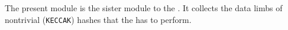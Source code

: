 The present module is the sister module to the \hashInfoMod{}.
It collects the data limbs of nontrivial (\texttt{KECCAK}) hashes that the \zkEvm{} has to perform.
